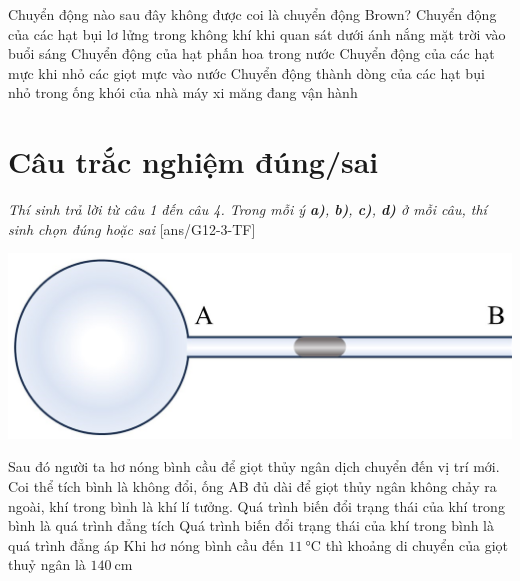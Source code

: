 \begin{ex}
	Chuyển động nào sau đây không được coi là chuyển động Brown?
	\choice
	{Chuyển động của các hạt bụi lơ lửng trong không khí khi quan sát dưới ánh nắng mặt trời vào buổi sáng}
	{Chuyển động của hạt phấn hoa trong nước}
	{Chuyển động của các hạt mực khi nhỏ các giọt mực vào nước}
	{\True Chuyển động thành dòng của các hạt bụi nhỏ trong ống khói của nhà máy xi măng đang vận hành}
	\loigiai{}
\end{ex}
\section{Câu trắc nghiệm đúng/sai} 
\textit{Thí sinh trả lời từ câu 1 đến câu 4. Trong mỗi ý \textbf{a)}, \textbf{b)}, \textbf{c)}, \textbf{d)} ở mỗi câu, thí sinh chọn đúng hoặc sai}
\setcounter{ex}{0}
[ans/G12-3-TF]
\begin{ex}
	{\includegraphics[width=0.5\linewidth]{../figs/D12-2-6}
		
	}
	Sau đó người ta hơ nóng bình cầu để	giọt thủy ngân dịch chuyển đến vị trí mới. Coi thể tích bình là không đổi, ống AB đủ dài để giọt thủy ngân không chảy ra ngoài, khí trong bình là khí lí tưởng.
	{Quá trình biến đổi trạng thái của khí trong bình là quá trình đẳng tích}
	{\True Quá trình biến đổi trạng thái của khí trong bình là quá trình đẳng áp}
	{Khi hơ nóng bình cầu đến $\SI{11}{\celsius}$ thì khoảng di chuyển của giọt thuỷ ngân là $\SI{140}{\centi\meter}$}
\end{ex}
